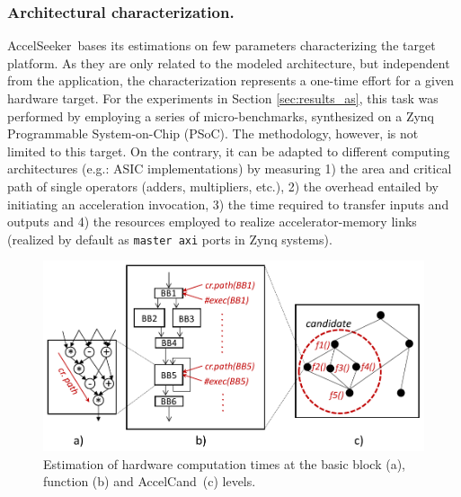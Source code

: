 \documentclass[]{usiinfthesis}
\newcommand{\aseeker}{{AccelSeeker}}
\newcommand{\candidate}{{AccelCand}}
\begin{document}
\subsubsection{Architectural characterization.}
\aseeker\ bases its estimations on few parameters characterizing the
target platform.  As they are only related to the modeled architecture, but 
independent from the application, the characterization represents a one-time 
effort for a given hardware target.
For the experiments in Section \ref{sec:results_as}, this task was
performed by employing a series of micro-benchmarks, synthesized on a
Zynq Programmable System-on-Chip (PSoC). 
The methodology, however, is not limited to this target. On the contrary, it can 
be adapted to different computing architectures (e.g.: ASIC implementations) by 
measuring 1) the area and critical path of single operators (adders, multipliers, 
etc.), 2) the overhead entailed by initiating an acceleration invocation, 3) the 
time required to transfer inputs and outputs and 4) the resources employed to realize 
accelerator-memory links (realized by default as \texttt{master axi} ports in Zynq 
systems).\par

\begin{figure}[!t]
  \centering
  \includegraphics[width=.8\linewidth]{figs/merit_estimation.pdf}
  \caption{Estimation of hardware computation times at the basic block (a), function (b) and 
  \candidate\ (c) levels.}
  \label{fig:hw-comp}
\end{figure}
\end{document}
